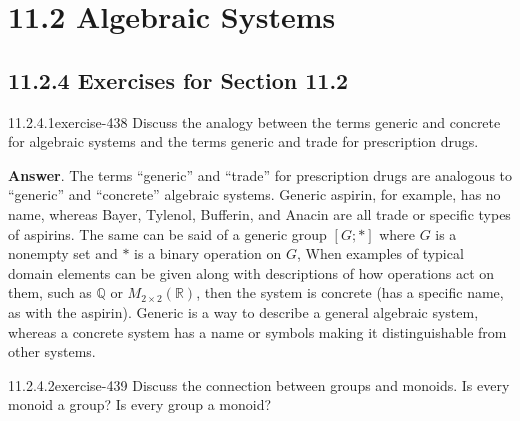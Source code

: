 \documentclass[twoside,10pt,]{book}
\numberwithin{equation}{section}
\begin{document}
\section*{11.2 Algebraic Systems}
\subsection*{11.2.4 Exercises for Section 11.2}
\begin{divisionsolution}{11.2.4.1}{}{exercise-438}%
\hypertarget{p-3851}{}%
Discuss the analogy between the terms generic and concrete for algebraic systems and the terms generic and trade for prescription drugs.%
\par\smallskip%
\noindent\textbf{Answer}.\quad%
\hypertarget{p-3852}{}%
The terms ``generic'' and ``trade'' for prescription drugs are analogous to ``generic'' and ``concrete'' algebraic systems. Generic aspirin, for example, has no name, whereas Bayer, Tylenol, Bufferin, and Anacin are all trade or specific types of aspirins. The same can be said of a generic group \([G; *]\) where \(G\) is a nonempty set and \(*\) is a binary operation on \(G\), When examples of typical domain elements can be given along with descriptions of how operations act on them, such as \(\mathbb{Q}\)\textasteriskcentered{} or \(M_{2\times 2}(\mathbb{R})\), then the system is concrete (has a specific name, as with the aspirin). Generic is a way to describe a general algebraic system, whereas a concrete system has a name or symbols making it distinguishable from other systems.%
\end{divisionsolution}%
\begin{divisionsolution}{11.2.4.2}{}{exercise-439}%
\hypertarget{p-3853}{}%
Discuss the connection between groups and monoids. Is every monoid a group? Is every group a monoid?%
\end{divisionsolution}%
\end{document}
